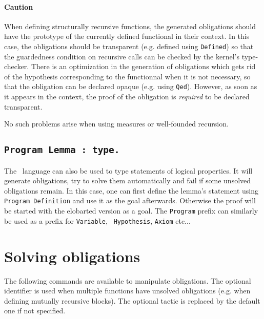 \paragraph{Caution}
When defining structurally recursive functions, the
generated obligations should have the prototype of the currently defined functional
in their context. In this case, the obligations should be transparent
(e.g. defined using {\tt Defined}) so that the guardedness condition on
recursive calls can be checked by the
kernel's type-checker. There is an optimization in the generation of
obligations which gets rid of the hypothesis corresponding to the
functionnal when it is not necessary, so that the obligation can be
declared opaque (e.g. using {\tt Qed}). However, as soon as it appears in the
context, the proof of the obligation is \emph{required} to be declared transparent.

No such problems arise when using measures or well-founded recursion.

\subsection{\tt Program Lemma {\ident} : type.
  \label{ProgramLemma}}

The \Russell\ language can also be used to type statements of logical
properties. It will generate obligations, try to solve them
automatically and fail if some unsolved obligations remain. 
In this case, one can first define the lemma's
statement using {\tt Program Definition} and use it as the goal afterwards.
Otherwise the proof will be started with the elobarted version as a goal.
The {\tt Program} prefix can similarly be used as a prefix for {\tt Variable}, {\tt
  Hypothesis}, {\tt Axiom} etc...

\section{Solving obligations}
The following commands are available to manipulate obligations. The
optional identifier is used when multiple functions have unsolved
obligations (e.g. when defining mutually recursive blocks). The optional
tactic is replaced by the default one if not specified.

